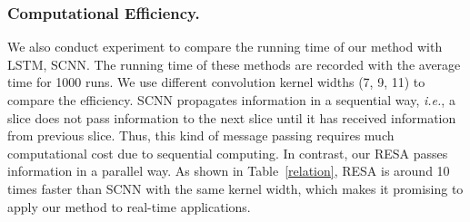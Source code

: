 \documentclass[letterpaper]{article} \usepackage{aaai21}  \usepackage{times}  \usepackage{helvet} \usepackage{courier}  \usepackage[hyphens]{url}  \usepackage{graphicx} \urlstyle{rm} \def\UrlFont{\rm}  \usepackage{natbib}  \usepackage{caption} \frenchspacing  \setlength{\pdfpagewidth}{8.5in}  \setlength{\pdfpageheight}{11in}  \usepackage{amsmath}
\begin{document}
\begin{table}[!tbh]
\centering
{}
\caption{The comparison between SCNN and RESA trained using VGG16 and ResNet34 as backbone.}
\label{resa_scnn}
\vspace{-5pt}
\end{table}



\subsubsection{Computational Efficiency.}
We also conduct experiment to compare the running time of our method with LSTM, SCNN. The running time of these methods are recorded with the average time for 1000 runs. We use different convolution kernel widths (7, 9, 11) to compare the efficiency. SCNN propagates information in a sequential way, \emph{i.e.}, a slice does not pass information to the next slice until it has received information from previous slice. Thus, this kind of message passing requires much computational cost due to sequential computing. In contrast, our RESA passes information in a parallel way. As shown in Table~\ref{relation}, RESA is around 10 times faster than SCNN with the same kernel width, which makes it promising to apply our method to real-time applications.

\begin{table}[!tbh]
\centering
{}
\caption{Runtime of LSTM, SCNN, and RESA. The iteration in RESA is 4.}
\label{relation}
\end{table}
\vspace{-5pt}
\end{document}
